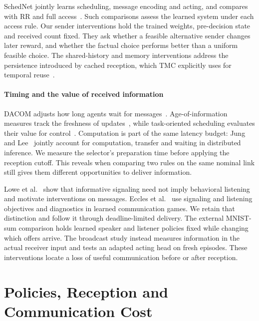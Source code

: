 \documentclass[a4paper,fleqn]{cas-dc}
\begin{document}
SchedNet jointly learns scheduling, message encoding and acting, and compares with RR and full access~\citep{kim2019schedule}. Such comparisons assess the learned system under each access rule. Our sender interventions hold the trained weights, pre-decision state and received count fixed. They ask whether a feasible alternative sender changes later reward, and whether the factual choice performs better than a uniform feasible choice. The shared-history and memory interventions address the persistence introduced by cached reception, which TMC explicitly uses for temporal reuse~\citep{zhang2020succinct}.

\paragraph{Timing and the value of received information}
DACOM adjusts how long agents wait for messages~\citep{yuan2023dacom}. Age-of-information measures track the freshness of updates~\citep{kaul2012real}, while task-oriented scheduling evaluates their value for control~\citep{ayan2022semantics}. Computation is part of the same latency budget: Jung and Lee~\citep{jung2023splitting} jointly account for computation, transfer and waiting in distributed inference. We measure the selector's preparation time before applying the reception cutoff. This reveals when comparing two rules on the same nominal link still gives them different opportunities to deliver information.

Lowe et al.~\citep{lowe2019pitfalls} show that informative signaling need not imply behavioral listening and motivate interventions on messages. Eccles et al.~\citep{eccles2019biases} use signaling and listening objectives and diagnostics in learned communication games. We retain that distinction and follow it through deadline-limited delivery. The external MNIST-sum comparison holds learned speaker and listener policies fixed while changing which offers arrive. The broadcast study instead measures information in the actual receiver input and tests an adapted acting head on fresh episodes. These interventions locate a loss of useful communication before or after reception.

\section{Policies, Reception and Communication Cost}
\end{document}
